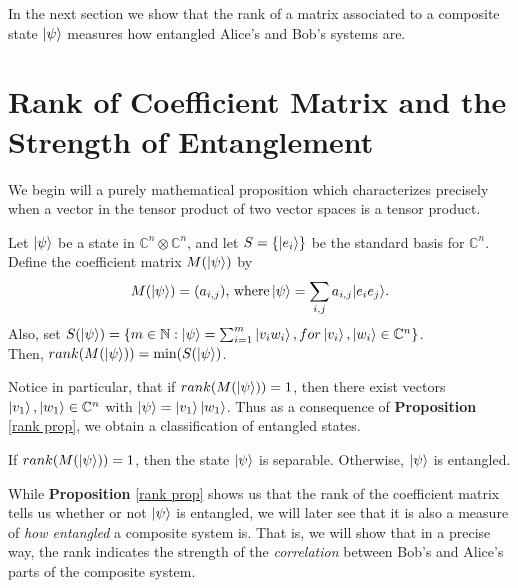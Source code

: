 In the next section we show that the rank of a matrix associated to a composite state $\ket{\psi}$ measures how entangled Alice's and Bob's systems are.

\pagebreak

\section{Rank of Coefficient Matrix and the Strength of Entanglement}
\label{Section 6.1}

We begin will a purely mathematical proposition which characterizes precisely when a vector in the tensor product of two vector spaces is a tensor product.

\begin{prop}
\label{rank prop}
Let $\ket{\psi}$ be a state in $\mathbb{C}^n \otimes \mathbb{C}^n$, and let $S=\{\ket{e_i}\}$ be the standard basis for $\mathbb{C}^n$. Define the coefficient matrix $M(\ket{\psi})$ by
\begin{equation}
M(\ket{\psi})=(a_{i,j}) \textrm{, where}\ket{\psi}=\sum\limits_{i,j}a_{i,j}|e_i e_j\rangle . 
\end{equation}
Also, set $S(\ket{\psi})=\{m\in \mathbb{N}: \ket{\psi}=\sum_{i=1}^m\ket{v_i w_i}, for \ket{v_i}, \ket{w_i} \in \mathbb{C}^n\}$.\\  Then, $rank(M(\ket{\psi}))=\textrm{min} (S(\ket{\psi})$.
\end{prop}

Notice in particular, that if $rank(M(\ket{\psi}))=1$, then there exist vectors $\ket{v_1}, \ket{w_1} \in \mathbb{C}^n$ with $\ket{\psi}=\ket{v_1}\ket{w_1}$.  Thus as a consequence of {\bf{Proposition}} \ref{rank prop}, we obtain a classification of entangled states.
\begin{corollary}
If $rank(M(\ket{\psi}))=1$, then the state $\ket{\psi}$ is separable. Otherwise, $\ket{\psi}$ is entangled.
\end{corollary}

While {\bf{Proposition}} \ref{rank prop} shows us that the rank of the coefficient matrix tells us whether or not $\ket{\psi}$ is entangled, we will later see that it is also a measure of {\emph{how entangled}} a composite system is. That is, we will show that in a precise way, the rank indicates the strength of the {\emph{correlation}} between Bob's and Alice's parts of the composite system.

